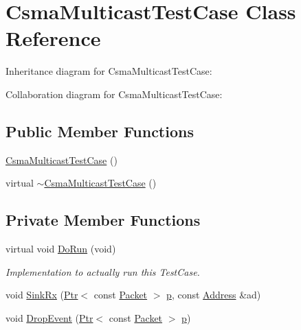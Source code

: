 \hypertarget{classCsmaMulticastTestCase}{}\section{Csma\+Multicast\+Test\+Case Class Reference}
\label{classCsmaMulticastTestCase}


Inheritance diagram for Csma\+Multicast\+Test\+Case\+:


Collaboration diagram for Csma\+Multicast\+Test\+Case\+:
\subsection*{Public Member Functions}
\begin{DoxyCompactItemize}
\item 
\hyperlink{classCsmaMulticastTestCase_a013261c9d455fe5547fbdec71e42ca86}{Csma\+Multicast\+Test\+Case} ()
\item 
virtual \hyperlink{classCsmaMulticastTestCase_a7ea0b5575884230e9ce6ab2a0f7a5a54}{$\sim$\+Csma\+Multicast\+Test\+Case} ()
\end{DoxyCompactItemize}
\subsection*{Private Member Functions}
\begin{DoxyCompactItemize}
\item 
virtual void \hyperlink{classCsmaMulticastTestCase_a1251df8e18b5cc31f4aa6f88bda7ffd5}{Do\+Run} (void)
\begin{DoxyCompactList}\small\item\em Implementation to actually run this Test\+Case. \end{DoxyCompactList}\item 
void \hyperlink{classCsmaMulticastTestCase_a8a57a1aac467c97fb162b7acaeebfebd}{Sink\+Rx} (\hyperlink{classns3_1_1Ptr}{Ptr}$<$ const \hyperlink{classns3_1_1Packet}{Packet} $>$ \hyperlink{lte__link__budget__x2__handover__measures_8m_ac9de518908a968428863f829398a4e62}{p}, const \hyperlink{classns3_1_1Address}{Address} \&ad)
\item 
void \hyperlink{classCsmaMulticastTestCase_ac86ad9363cbdc9aa295f42a548701fda}{Drop\+Event} (\hyperlink{classns3_1_1Ptr}{Ptr}$<$ const \hyperlink{classns3_1_1Packet}{Packet} $>$ \hyperlink{lte__link__budget__x2__handover__measures_8m_ac9de518908a968428863f829398a4e62}{p})
\end{DoxyCompactItemize}
